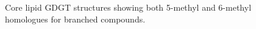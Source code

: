 \begin{figure}[h!]
	\caption[Core lipid GDGT structures]{Core lipid GDGT structures showing both 5-methyl and 6-methyl homologues for branched compounds.}
	\label{Ch5Fig:S1} 
\end{figure}

\renewcommand\thefigure{\thechapter.\arabic{figure}}
